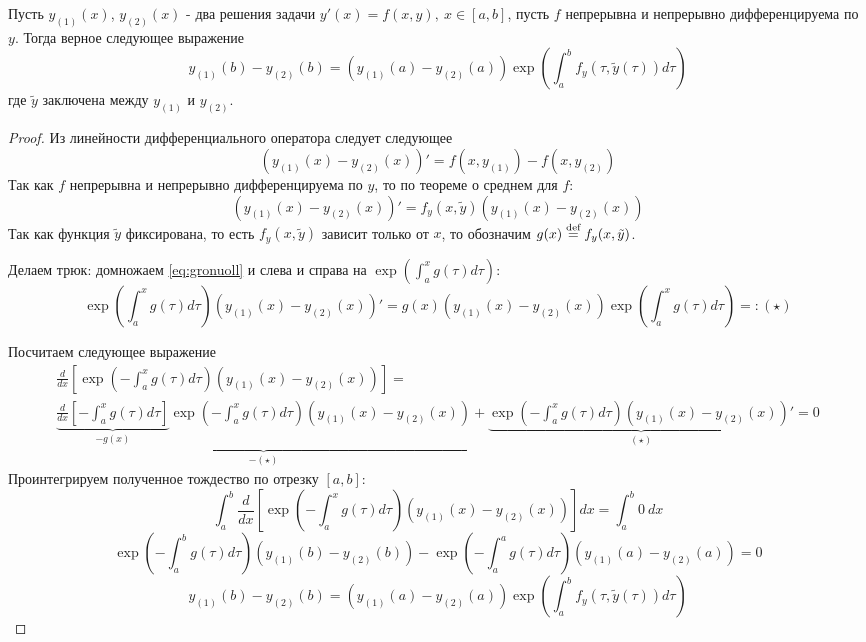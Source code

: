 \begin{lemma}[Гронуолл]
  Пусть $y_{(1)}(x)$, $y_{(2)}(x)$ - два решения задачи $y'(x)=f(x,y),\ x\in[a,b]$,
  пусть $f$ непрерывна и непрерывно дифференцируема по $y$.
  Тогда верное следующее выражение
  \[y_{(1)}(b)-y_{(2)}(b)=(y_{(1)}(a)-y_{(2)}(a))\exp\left(\int_a^bf_y(\tau, \tilde{y}(\tau))d\tau\right)\]
  где $\tilde{y}$ заключена между $y_{(1)}$ и $y_{(2)}$.
\end{lemma}
\begin{proof}
  Из линейности дифференциального оператора следует следующее
  \[(y_{(1)}(x)-y_{(2)}(x))'=f(x,y_{(1)})-f(x,y_{(2)})\]
  Так как $f$ непрерывна и непрерывно дифференцируема по $y$,
  то по теореме о среднем для $f$:
  \begin{equation}\label{eq:gronuoll}
    (y_{(1)}(x)-y_{(2)}(x))'=f_y(x,\tilde{y})(y_{(1)}(x)-y_{(2)}(x))
  \end{equation}
  Так как функция $\tilde{y}$ фиксирована, то есть
  $f_y(x,\tilde{y})$ зависит только от $x$, то обозначим $g(x)\stackrel{\text{def}}{=} f_y(x,\tilde{y})$.

  Делаем трюк: домножаем \eqref{eq:gronuoll} и слева и справа на $\exp\left(\int_a^x g(\tau)d\tau\right)$:
  \[\exp\left(\int_a^x g(\tau)d\tau\right)(y_{(1)}(x)-y_{(2)}(x))'=g(x)(y_{(1)}(x)-y_{(2)}(x))\exp\left(\int_a^x g(\tau)d\tau\right)=:(\star)\]

  Посчитаем следующее выражение
  \begin{multline*}
    \frac{d}{dx}\left[\exp\left(-\int_a^x g(\tau)d\tau\right)(y_{(1)}(x)-y_{(2)}(x))\right]= \\
    \underbrace{\underbrace{\frac{d}{dx}\left[-\int_a^x g(\tau)d\tau\right]}_{-g(x)}\exp\left(-\int_a^x g(\tau)d\tau\right)(y_{(1)}(x)-y_{(2)}(x))}_{-(\star)}+\underbrace{\exp\left(-\int_a^x g(\tau)d\tau\right)(y_{(1)}(x)-y_{(2)}(x))'}_{(\star)}=0
  \end{multline*}
  Проинтегрируем полученное тождество по отрезку $[a,b]$:
  \[\int_{a}^b\frac{d}{dx}\left[\exp\left(-\int_a^x g(\tau)d\tau\right)(y_{(1)}(x)-y_{(2)}(x))\right]dx=\int_a^b0\ dx\]
  \[\exp\left(-\int_a^b g(\tau)d\tau\right)(y_{(1)}(b)-y_{(2)}(b))-\exp\left(-\int_a^a g(\tau)d\tau\right)(y_{(1)}(a)-y_{(2)}(a))=0\]
  \[y_{(1)}(b)-y_{(2)}(b)=(y_{(1)}(a)-y_{(2)}(a))\exp\left(\int_a^b f_y(\tau,\tilde{y}(\tau))d\tau\right)\]
\end{proof}

